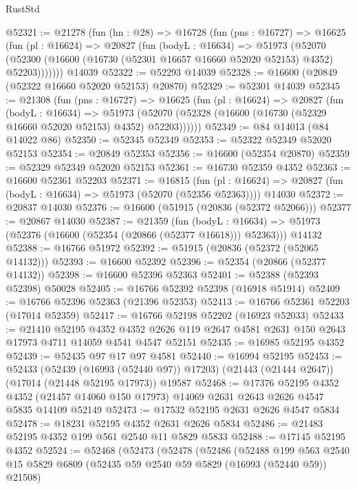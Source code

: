 \begin{lexlean}{RustStd}
\begin{coremodule}
{\begin{coremodule}
{{{{{{{{{{{{{{{{{{{{{{{{{{{{{{{{{{{{{{{{{{{{{{{{{{{{{{{@52321 := @21278
    (fun (hn : @28) =>
    @16728
      (fun (pns : @16727) =>
      @16625
        (fun (pl : @16624) =>
        @20827
          (fun (bodyL : @16634) =>
          @51973
            (@52070
              (@52300 (@16600 (@16730 (@52301 @16657 @16660 @52020 @52153) @4352) @52203)))))))
    @14039
@52322 := @52293 @14039
@52328 := @16600 (@20849 (@52322 @16660 @52020 @52153) @20870)
@52329 := @52301 @14039
@52345 := @21308
    (fun (pns : @16727) =>
    @16625
      (fun (pl : @16624) =>
      @20827
        (fun (bodyL : @16634) =>
        @51973 (@52070 (@52328 (@16600 (@16730 (@52329 @16660 @52020 @52153) @4352) @52203))))))
@52349 := @84 @14013 (@84 @14022 @86)
@52350 := @52345 @52349
@52353 := @52322 @52349 @52020 @52153
@52354 := @20849 @52353
@52356 := @16600 (@52354 @20870)
@52359 := @52329 @52349 @52020 @52153
@52361 := @16730 @52359 @4352
@52363 := @16600 @52361 @52203
@52371 := @16815
    (fun (pl : @16624) => @20827 (fun (bodyL : @16634) => @51973 (@52070 (@52356 @52363))))
    @14030
@52372 := @20837 @14030
@52376 := @16600 (@51915 (@20836 (@52372 @52066)))
@52377 := @20867 @14030
@52387 := @21359
    (fun (bodyL : @16634) => @51973 (@52376 (@16600 (@52354 (@20866 (@52377 @16618))) @52363)))
    @14132
@52388 := @16766 @51972
@52392 := @51915 (@20836 (@52372 (@52065 @14132)))
@52393 := @16600 @52392
@52396 := @52354 (@20866 (@52377 @14132))
@52398 := @16600 @52396 @52363
@52401 := @52388 (@52393 @52398) @50028
@52405 := @16766 @52392 @52398 (@16918 @51914)
@52409 := @16766 @52396 @52363 (@21396 @52353)
@52413 := @16766 @52361 @52203 (@17014 @52359)
@52417 := @16766 @52198 @52202 (@16923 @52033)
@52433 := @21410
    @52195
    @4352
    @4352
    @2626
    @119
    @2647
    @4581
    @2631
    @150
    @2643
    @17973
    @4711
    @14059
    @4541
    @4547
    @52151
@52435 := @16985 @52195 @4352
@52439 := @52435 @97 @17 @97 @4581
@52440 := @16994 @52195
@52453 := @52433
    (@52439 (@16993 (@52440 @97)) @17203)
    (@21443 (@21444 @2647))
    (@17014 (@21448 @52195 @17973))
    @19587
@52468 := @17376
    @52195
    @4352
    @4352
    (@21457 @14060 @150 @17973)
    @14069
    @2631
    @2643
    @2626
    @4547
    @5835
    @14109
    @52149
@52473 := @17532 @52195 @2631 @2626 @4547 @5834
@52478 := @18231 @52195 @4352 @2631 @2626 @5834
@52486 := @21483 @52195 @4352 @199 @561 @2540 @11 @5829 @5833
@52488 := @17145 @52195 @4352
@52524 := @52468
    (@52473
      (@52478
        (@52486
          (@52488
            @199
            @563
            @2540
            @15
            @5829
            @6809
            (@52435 @59 @2540 @59 @5829 (@16993 (@52440 @59)) @21508)
}}}}}}}}}}}}}}}}}}}}}}}}}}}}}}}}}}}}}}}}}}}}}}}}}}}}}}}
\end{coremodule}}
\end{coremodule}
\end{lexlean}
